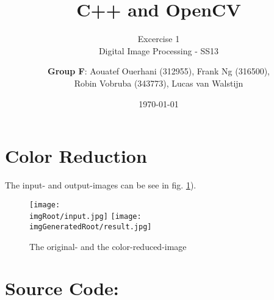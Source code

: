 \documentclass[a4paper,headings=small]{scrartcl}
\title{C++ and OpenCV}
\subtitle{Excercise 1 \\ Digital Image Processing - SS13}
\author{\textbf{Group F}: Aouatef Ouerhani (312955), Frank Ng (316500),\\ Robin Vobruba (343773), Lucas van Walstijn}
\date{\today}
\numberwithin{equation}{section} %
\numberwithin{figure}{section}   %
\newcommand{\imgRoot}{../resources/img}
\newcommand{\imgGeneratedRoot}{../../../target}
\begin{document}
\maketitle

\section{Color Reduction}

The input- and output-images can be see in
fig. \ref{fig:inOutImg}).

\begin{figure}[htbp]
	\centering
	\texttt{[image: \\imgRoot/input.jpg]}
	\texttt{[image: \\imgGeneratedRoot/result.jpg]}
	\caption{The original- and the color-reduced-image}
	\label{fig:inOutImg}
\end{figure}


\newpage
\section{Source Code:}


\end{document}
